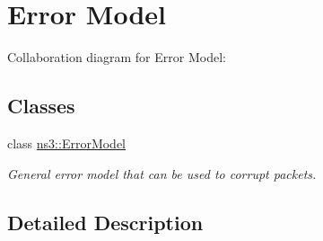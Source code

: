 \hypertarget{group__errormodel}{}\section{Error Model}
\label{group__errormodel}
Collaboration diagram for Error Model\+:
\subsection*{Classes}
\begin{DoxyCompactItemize}
\item 
class \hyperlink{classns3_1_1ErrorModel}{ns3\+::\+Error\+Model}
\begin{DoxyCompactList}\small\item\em General error model that can be used to corrupt packets. \end{DoxyCompactList}\end{DoxyCompactItemize}


\subsection{Detailed Description}
